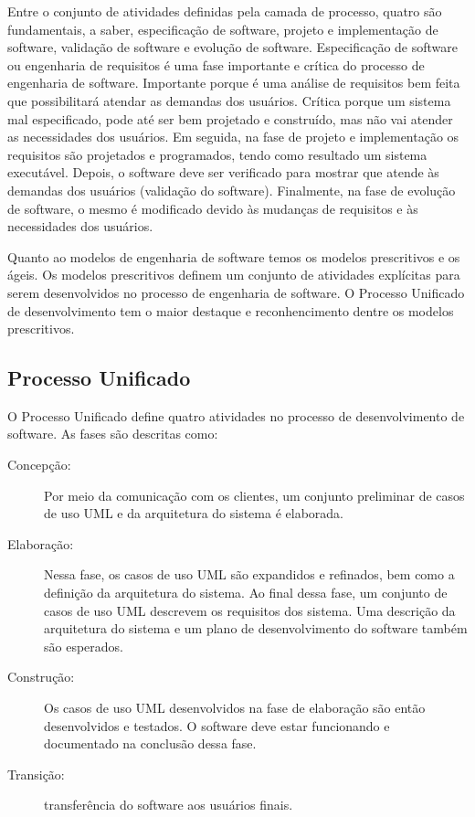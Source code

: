 Entre o conjunto de atividades definidas pela camada de processo, quatro são
fundamentais, a saber, especificação de software, projeto e implementação de
software, validação de software e evolução de software. Especificação de software
ou engenharia de requisitos é uma fase importante e crítica do processo de engenharia
de software. Importante porque é uma análise de requisitos bem feita que possibilitará
atendar as demandas dos usuários. Crítica porque um sistema mal especificado, pode até ser
bem projetado e construído, mas não vai atender as necessidades dos usuários.
Em seguida, na fase de projeto e implementação os requisitos são projetados e programados,
tendo como resultado um sistema executável. Depois, o software deve ser verificado
para mostrar que atende às demandas dos usuários (validação do software). Finalmente,
na fase de evolução de software, o mesmo é modificado devido às mudanças
de requisitos e às necessidades dos usuários.

Quanto ao modelos de engenharia de software temos os modelos prescritivos e os ágeis.
Os modelos prescritivos definem um conjunto de atividades explícitas para serem
desenvolvidos no processo de engenharia de software. O Processo Unificado de desenvolvimento
tem o maior destaque e reconhencimento dentre os modelos prescritivos.

\subsection{Processo Unificado}
O Processo Unificado define quatro atividades no processo de desenvolvimento de software.
As fases são descritas como:

\begin{description}
  \item [{Concepção:}] Por meio da comunicação com os clientes, um conjunto
  preliminar de casos de uso UML e da arquitetura do sistema é elaborada.
  \item [{Elaboração:}] Nessa fase, os casos de uso UML são expandidos e
  refinados, bem como a definição da arquitetura do sistema. Ao final
  dessa fase, um conjunto de casos de uso UML descrevem os requisitos
  dos sistema. Uma descrição da arquitetura do sistema e um plano de
  desenvolvimento do software também são esperados.
  \item [{Construção:}] Os casos de uso UML desenvolvidos na fase de elaboração
  são então desenvolvidos e testados. O software deve estar funcionando
  e documentado na conclusão dessa fase.
  \item [{Transição:}] transferência do software aos usuários finais.
\end{description}


